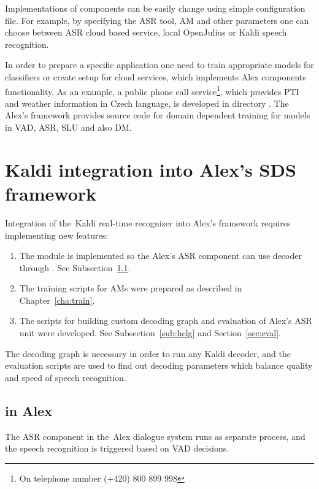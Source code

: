 Implementations of components can be easily change using simple configuration file. 
For example, by specifying the \ac{ASR} tool, \ac{AM} and other parameters one can choose between \ac{ASR} cloud based service, local OpenJulius or Kaldi speech recognition.

In order to prepare a specific application one need to train appropriate models for classifiers or create setup for cloud services, which implements Alex components functionality.
As an example, a public phone call service\footnote{On telephone number (+420) 800 899 998}, which provides \ac{PTI} and weather information in Czech language,  is developed in directory .
The Alex's framework provides source code for domain dependent training for models in \ac{VAD}, \ac{ASR}, \ac{SLU} and also \ac{DM}.



\section[Kaldi integration into \acs{SDS} framework]{Kaldi integration into Alex's \acl{SDS} framework}
\label{sec:asrsds}

Integration of the~Kaldi real-time recognizer into Alex's framework requires implementing new features:
\begin{enumerate}
    \item The  module is implemented so the Alex's \ac{ASR} component can use  decoder through .
        See Subsection~\ref{sub:asr_component}.
    \item  The training scripts for \acp{AM} were prepared as described in Chapter~\ref{cha:train}.
    \item  The scripts for building custom decoding graph  and evaluation of Alex's \ac{ASR} unit were developed.
        See Subsection~\ref{sub:hclg} and Section~\ref{sec:eval}.
\end{enumerate}

The decoding graph  is necessary in order to run any Kaldi decoder, and the evaluation scripts are used to find out decoding parameters which balance quality and speed of speech recognition.

\subsection{ in Alex}
\label{sub:asr_component}
The \ac{ASR} component in the~Alex dialogue system runs as separate process, and the speech recognition is triggered based on \ac{VAD} decisions.

